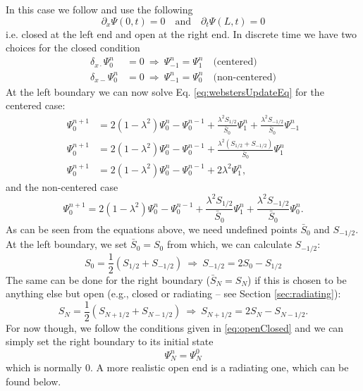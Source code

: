 \documentclass[dvipsnames]{article}
\begin{document}
In this case we follow \cite[Chapter 9]{Bilbao2009} and use the following
\begin{equation}\label{eq:openClosed}
    \partial_x\Psi(0, t) = 0 \quad \text{and} \quad \partial_t\Psi(L, t) = 0
\end{equation}
i.e. closed at the left end and open at the right end. In discrete time we have two choices for the closed condition
\begin{equation}\label{eq:centNonCentBound}
\begin{split}
    \delta_{x\cdot}\Psi_0^n &= 0 \ \Rightarrow \ \Psi_{-1}^n = \Psi_1^n \quad \text{(centered)}\\
    \delta_{x-}\Psi_0^n &= 0\  \Rightarrow \ \Psi_{-1}^n = \Psi_0^n\quad \text{(non-centered)}
\end{split}
\end{equation}
At the left boundary we can now solve Eq. \eqref{eq:webstersUpdateEq} for the centered case:
\begin{equation}
    \begin{aligned}
        \Psi_0^{n+1} &= 2(1-\lambda^2)\Psi_0^n-\Psi_0^{n-1}+ \frac{\lambda^2S_{1/2}}{\bar S_0}\Psi_1^n + \frac{\lambda^2S_{-1/2}}{\bar S_0}\Psi_{-1}^n\nonumber\\
        \Psi_0^{n+1} &= 2(1-\lambda^2)\Psi_0^n-\Psi_0^{n-1}+ \frac{\lambda^2(S_{1/2}+S_{-1/2})}{\bar S_0}\Psi_1^n\nonumber\\
         \Psi_0^{n+1} &= 2(1-\lambda^2)\Psi_0^n-\Psi_0^{n-1}+ 2\lambda^2\Psi_1^n,
    \end{aligned}
\end{equation}
and the non-centered case
\begin{equation}\label{eq:nonCentLeft}
    \Psi_0^{n+1} = 2(1-\lambda^2)\Psi_0^n-\Psi_0^{n-1}+ \frac{\lambda^2S_{1/2}}{\bar S_0}\Psi_1^n + \frac{\lambda^2S_{-1/2}}{\bar S_0}\Psi_0^n.
\end{equation}
As can be seen from the equations above, we need undefined points $\bar S_0$ and $S_{-1/2}$. At the left boundary, we set $\bar S_0 = S_0$ from which, we can calculate $S_{-1/2}$:
\begin{equation}
        S_0 = \frac{1}{2}(S_{1/2} + S_{-1/2}) \ \Rightarrow \  S_{-1/2}
        = 2S_0 - S_{1/2}
\end{equation}
The same can be done for the right boundary ($\bar S_N = S_N$) if this is chosen to be anything else but open (e.g., closed or radiating -- see Section \ref{sec:radiating}):
\begin{equation}
    S_N = \frac{1}{2}(S_{N+1/2} + S_{N-1/2}) \ \Rightarrow \ S_{N+1/2} = 2S_N - S_{N-1/2}.
\end{equation}
For now though, we follow the conditions given in \eqref{eq:openClosed} and we can simply set the right boundary to its initial state
\begin{equation}
    \Psi_N^n = \Psi_N^0
\end{equation}
which is normally $0$. A more realistic open end is a radiating one, which can be found below.
\end{document}
